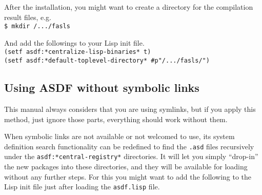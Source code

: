 \documentclass[11pt,a4paper,dvipdfm]{article}
\newcommand{\prompttext}[1]{\texttt{#1}}
\newcommand{\shprompt}[1]{\prompttext{\$ #1}}
\begin{document}
After the installation, you might want to create a directory for the
compilation result files, e.g. \\
\shprompt{mkdir /.../fasls}

And add the followings to your Lisp init file. \\
\prompttext{(setf asdf:*centralize-lisp-binaries* t)} \\
\prompttext{(setf asdf:*default-toplevel-directory* \#p"/.../fasls/")}

\hypertarget{nosymlink}{\subsection{Using ASDF without symbolic links}}

This manual always considers that you are using symlinks, but if you apply
this method, just ignore those parts, everything should work without them.

When symbolic links are not available or not welcomed to use, its system
definition search functionality can be redefined to find the \prompttext{.asd}
files recursively under the \prompttext{asdf:*central-registry*} directories.
It will let you simply ``drop-in'' the new packages into these directories,
and they will be available for loading without any further steps. For this
you might want to add the following to the Lisp init file just after loading
the \prompttext{asdf.lisp} file.
\end{document}
